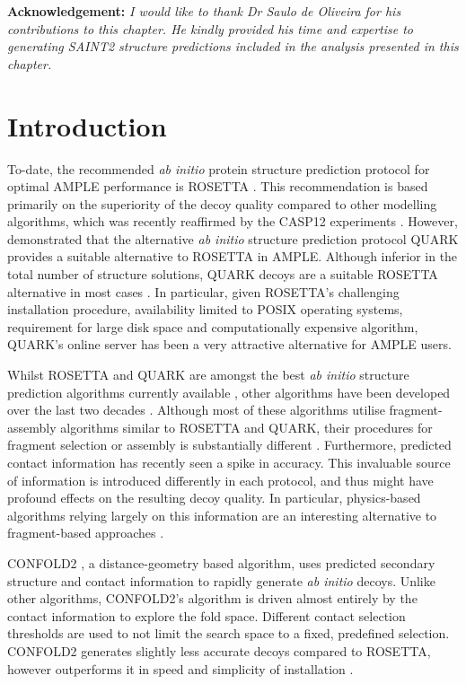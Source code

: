 \textbf{Acknowledgement: }\textit{I would like to thank Dr Saulo de Oliveira for his contributions to this chapter. He kindly provided his time and expertise to generating SAINT2 structure predictions included in the analysis presented in this chapter.}

\section{Introduction}
To-date, the recommended \textit{ab initio} protein structure prediction protocol for optimal AMPLE performance is ROSETTA \cite{Keegan2015-zb, Thomas2017-sh, Thomas2015-wu, Bibby2012-lm}. This recommendation is based primarily on the superiority of the decoy quality compared to other modelling algorithms, which was recently reaffirmed by the CASP12 experiments \cite{Abriata2018-lu,Ovchinnikov2017-wp}. However, \textcite{Keegan2015-zb} demonstrated that the alternative \textit{ab initio} structure prediction protocol QUARK provides a suitable alternative to ROSETTA in AMPLE. Although inferior in the total number of structure solutions, QUARK decoys are a suitable ROSETTA alternative in most cases \cite{Keegan2015-zb}. In particular, given ROSETTA's challenging installation procedure, availability limited to POSIX operating systems, requirement for large disk space and computationally expensive algorithm, QUARK's online server has been a very attractive alternative for AMPLE users.

Whilst ROSETTA and QUARK are amongst the best \textit{ab initio} structure prediction algorithms currently available \cite{Abriata2018-lu}, other algorithms have been developed over the last two decades \cite[e.g.,][]{Jones2001-mc,Ellis2010-zs,Adhikari2015-lb,Xu2012-jf,Marks2011-os,Wang2016-ar}. Although most of these algorithms utilise fragment-assembly algorithms similar to ROSETTA and QUARK, their procedures for fragment selection or assembly is substantially different \cite{Ellis2010-zs,Jones2001-mc}. Furthermore, predicted contact information has recently seen a spike in accuracy. This invaluable source of information is introduced differently in each protocol, and thus might have profound effects on the resulting decoy quality. In particular, physics-based algorithms relying largely on this information are an interesting alternative to fragment-based approaches \cite{Adhikari2015-lb,Marks2011-os,Wang2016-ar}.

CONFOLD2 \cite{Adhikari2018-lj}, a distance-geometry based algorithm, uses predicted secondary structure and contact information to rapidly generate \textit{ab initio} decoys. Unlike other algorithms, CONFOLD2's algorithm is driven almost entirely by the contact information to explore the fold space. Different contact selection thresholds are used to not limit the search space to a fixed, predefined selection. CONFOLD2 generates slightly less accurate decoys compared to ROSETTA, however outperforms it in speed and simplicity of installation \cite{Adhikari2018-lj,Michel2017-xh}.

